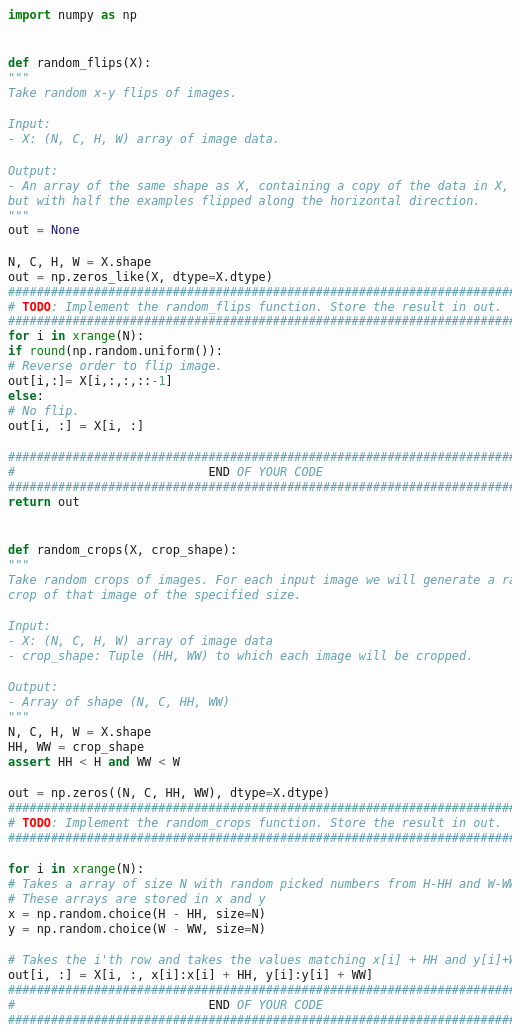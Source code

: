 \begin{lstlisting}[language=Python, label=lst:data_augmentation.py, caption={data\_augmentation.py}, basicstyle=\tiny]
import numpy as np


def random_flips(X):
"""
Take random x-y flips of images.

Input:
- X: (N, C, H, W) array of image data.

Output:
- An array of the same shape as X, containing a copy of the data in X,
but with half the examples flipped along the horizontal direction.
"""
out = None

N, C, H, W = X.shape
out = np.zeros_like(X, dtype=X.dtype)
#############################################################################
# TODO: Implement the random_flips function. Store the result in out.       #
#############################################################################
for i in xrange(N):
if round(np.random.uniform()):
# Reverse order to flip image.
out[i,:]= X[i,:,:,::-1]
else:
# No flip.
out[i, :] = X[i, :]

#############################################################################
#                           END OF YOUR CODE                                #
#############################################################################
return out


def random_crops(X, crop_shape):
"""
Take random crops of images. For each input image we will generate a random
crop of that image of the specified size.

Input:
- X: (N, C, H, W) array of image data
- crop_shape: Tuple (HH, WW) to which each image will be cropped.

Output:
- Array of shape (N, C, HH, WW)
"""
N, C, H, W = X.shape
HH, WW = crop_shape
assert HH < H and WW < W

out = np.zeros((N, C, HH, WW), dtype=X.dtype)
#############################################################################
# TODO: Implement the random_crops function. Store the result in out.       #
#############################################################################

for i in xrange(N):
# Takes a array of size N with random picked numbers from H-HH and W-WW
# These arrays are stored in x and y
x = np.random.choice(H - HH, size=N)
y = np.random.choice(W - WW, size=N)

# Takes the i'th row and takes the values matching x[i] + HH and y[i]+WW.
out[i, :] = X[i, :, x[i]:x[i] + HH, y[i]:y[i] + WW]
#############################################################################
#                           END OF YOUR CODE                                #
#############################################################################


\end{lstlisting}
